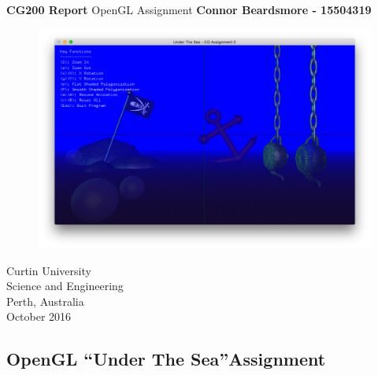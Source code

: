 \documentclass[]{article}
\begin{document}

\begin{titlepage}
	\begin{center}
		\vspace*{1cm}
		\LARGE\textbf{CG200 Report}
		\break
		OpenGL Assignment
		\vspace{1cm}
		\break
		\Large\textbf{Connor Beardsmore - 15504319} 

		\vspace{1cm}
		\begin{figure}[H]
			\begin{center}
				{ 
					\includegraphics[height=0.5\textheight,width=\textwidth]{scene.png}}
			\end{center}
		\end{figure}

		\vspace{2cm}
		\normalsize
		Curtin University \\
		Science and Engineering \\
		Perth, Australia \\
	    October 2016
	    
	\end{center}
\end{titlepage}


\vspace*{-0.8cm}
\begin{center}
	\section*{OpenGL \textquotedblleft Under The Sea\textquotedblright Assignment}
\end{center}
\end{document}
